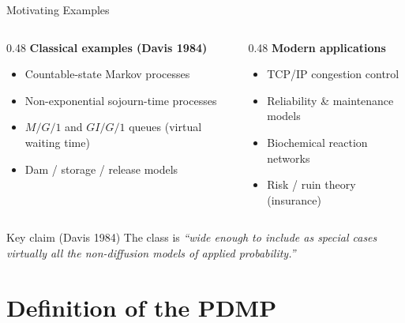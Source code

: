 \documentclass[aspectratio=169]{beamer}
\begin{document}
\begin{frame}{Motivating Examples}
  \begin{columns}[T]
    \begin{column}{0.48\textwidth}
      \textbf{Classical examples (Davis 1984)}
      \begin{itemize}
        \item Countable-state Markov processes
        \item Non-exponential sojourn-time processes
        \item $M/G/1$ and $GI/G/1$ queues (virtual waiting time)
        \item Dam / storage / release models
      \end{itemize}
    \end{column}
    \begin{column}{0.48\textwidth}
      \textbf{Modern applications}
      \begin{itemize}
        \item TCP/IP congestion control
        \item Reliability \& maintenance models
        \item Biochemical reaction networks
        \item Risk / ruin theory (insurance)
      \end{itemize}
    \end{column}
  \end{columns}
  \bigskip
  \begin{alertblock}{Key claim (Davis 1984)}
    The class is \emph{``wide enough to include as special cases virtually all the
    non-diffusion models of applied probability.''}
  \end{alertblock}
\end{frame}

\section{Definition of the PDMP}
\end{document}
